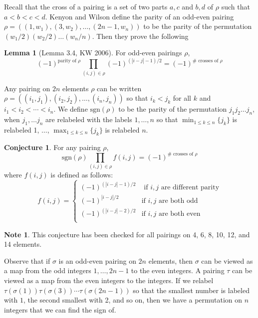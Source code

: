 \documentclass[11pt]{amsart}
\theoremstyle{definition}
\newtheorem*{conj*}{Conjecture}
\newtheorem*{lemma*}{Lemma}
\newtheorem*{note*}{Note}
\newcommand{\sgn}{\text{sgn}}
\begin{document}
Recall that the cross of a pairing is a set of two parts ${a, c}$ and ${b, d}$ of $\rho$ such that $a < b < c < d$. 
Kenyon and Wilson define the parity of an odd-even pairing $\rho = ((1, w_1), (3, w_2), \ldots, (2n-1, w_n))$ to be the parity of the permutation $(w_1/2)(w_2/2)\ldots(w_n/n)$. Then they prove the following

\begin{lemma*}[Lemma 3.4, KW 2006]
For odd-even pairings $\rho$, 
$$(-1)^{\text{parity of } \rho} \prod\limits_{(i, j) \in \rho} (-1)^{(|i-j|-1)/2} = (-1)^{\# \text{ crosses of } \rho}$$
\end{lemma*}

Any pairing on $2n$ elements $\rho$ can be written $\rho = ((i_1, j_1), (i_2, j_2), \ldots, (i_n, j_n))$ so that $i_k < j_k$ for all $k$ and $i_1 < i_2 < \cdots < i_n$. We define $\sgn(\rho)$ to be the parity of the permutation $j_1 j_2 \ldots j_n$, when $j_1, \ldots j_n$ are relabeled with the labels $1, \ldots, n$ so that $\min_{1 \leq k \leq n} \{j_{k} \}$ is relabeled 1, $\ldots$, $\max_{1 \leq k \leq n} \{j_{k} \}$ is relabeled $n$.

\begin{conj*}
For any pairing $\rho$, 
$$\sgn(\rho) \prod\limits_{(i, j) \in \rho} f(i, j) =  (-1)^{\# \text{ crosses of } \rho}$$
where $f(i, j)$ is defined as follows: 
$$f(i, j) = \begin{cases} 
(-1)^{(|i-j| -1)/2} & \mbox{ if $i, j$ are different parity} \\
(-1)^{|i-j|/2} & \mbox{if $i, j$ are both odd} \\
(-1)^{(|i-j|-2)/2} & \mbox{if $i, j$ are both even} \\
\end{cases}$$
\end{conj*}

\begin{note*}
This conjecture has been checked for all pairings on 4, 6, 8, 10, 12, and 14 elements. 
\end{note*}

Observe that if $\sigma$ is an odd-even pairing on $2n$ elements, then $\sigma$ can be viewed as a map from the odd integers $1, \ldots, 2n-1$ to the even integers. A pairing $\tau$ can be viewed as a map from the even integers to the integers. If we relabel $\tau(\sigma(1)) \tau(\sigma(3)) \cdots \tau(\sigma(2n-1))$ so that the smallest number is labeled with $1$, the second smallest with 2, and so on, then we have a permutation on $n$ integers that we can find the sign of. 
\end{document}
